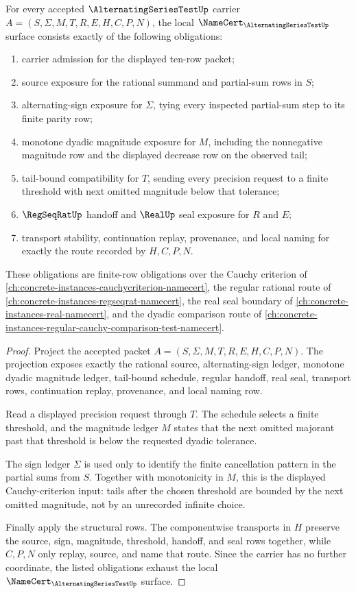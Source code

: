 \begin{theorem}
\label{thm:alternating-series-test-namecert-obligations}
For every accepted $\AlternatingSeriesTestUp$ carrier $A=(S,\Sigma,M,T,R,E,H,C,P,N)$, the local $\NameCert_{\AlternatingSeriesTestUp}$ surface consists exactly of the following obligations:
\begin{enumerate}
\item carrier admission for the displayed ten-row packet;
\item source exposure for the rational summand and partial-sum rows in $S$;
\item alternating-sign exposure for $\Sigma$, tying every inspected partial-sum step to its finite parity row;
\item monotone dyadic magnitude exposure for $M$, including the nonnegative magnitude row and the displayed decrease row on the observed tail;
\item tail-bound compatibility for $T$, sending every precision request to a finite threshold with next omitted magnitude below that tolerance;
\item $\RegSeqRatUp$ handoff and $\RealUp$ seal exposure for $R$ and $E$;
\item transport stability, continuation replay, provenance, and local naming for exactly the route recorded by $H,C,P,N$.
\end{enumerate}
These obligations are finite-row obligations over the Cauchy criterion of \autoref{ch:concrete-instances-cauchycriterion-namecert}, the regular rational route of \autoref{ch:concrete-instances-regseqrat-namecert}, the real seal boundary of \autoref{ch:concrete-instances-real-namecert}, and the dyadic comparison route of \autoref{ch:concrete-instances-regular-cauchy-comparison-test-namecert}.
\end{theorem}
\begin{proof}
Project the accepted packet $A=(S,\Sigma,M,T,R,E,H,C,P,N)$. The projection exposes exactly the rational source, alternating-sign ledger, monotone dyadic magnitude ledger, tail-bound schedule, regular handoff, real seal, transport rows, continuation replay, provenance, and local naming row.

Read a displayed precision request through $T$. The schedule selects a finite threshold, and the magnitude ledger $M$ states that the next omitted majorant past that threshold is below the requested dyadic tolerance.

The sign ledger $\Sigma$ is used only to identify the finite cancellation pattern in the partial sums from $S$. Together with monotonicity in $M$, this is the displayed Cauchy-criterion input: tails after the chosen threshold are bounded by the next omitted magnitude, not by an unrecorded infinite choice.

Finally apply the structural rows. The componentwise transports in $H$ preserve the source, sign, magnitude, threshold, handoff, and seal rows together, while $C,P,N$ only replay, source, and name that route. Since the carrier has no further coordinate, the listed obligations exhaust the local $\NameCert_{\AlternatingSeriesTestUp}$ surface.
\end{proof}

